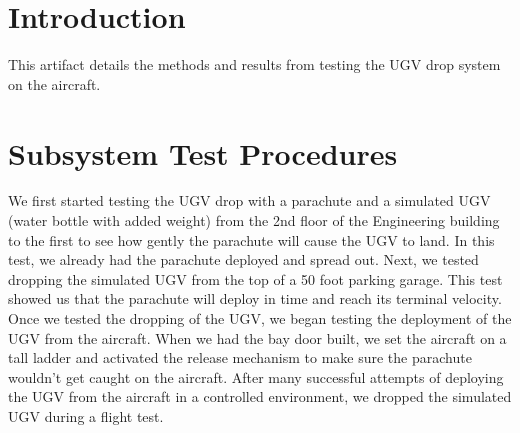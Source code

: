 \documentclass[]{auvsi_doc}
\begin{document}
\begin{AUVSITitlePage}
\begin{artifacttable} 
\end{artifacttable}
\end{AUVSITitlePage}


\section*{Introduction}
This artifact details the methods and results from testing the UGV drop system on the aircraft. 

\section*{Subsystem Test Procedures}
We first started testing the UGV drop with a parachute and a simulated UGV (water bottle with added weight) from the 2nd floor of the Engineering building to the first to see how gently the parachute will cause the UGV to land.
In this test, we already had the parachute deployed and spread out.
Next, we tested dropping the simulated UGV from the top of a 50 foot parking garage. This test showed us that the parachute will deploy in time and reach its terminal velocity.
Once we tested the dropping of the UGV, we began testing the deployment of the UGV from the aircraft.
When we had the bay door built, we set the aircraft on a tall ladder and activated the release mechanism to make sure the parachute wouldn't get caught on the aircraft.
After many successful attempts of deploying the UGV from the aircraft in a controlled environment, we dropped the simulated UGV during a flight test.
\end{document}
